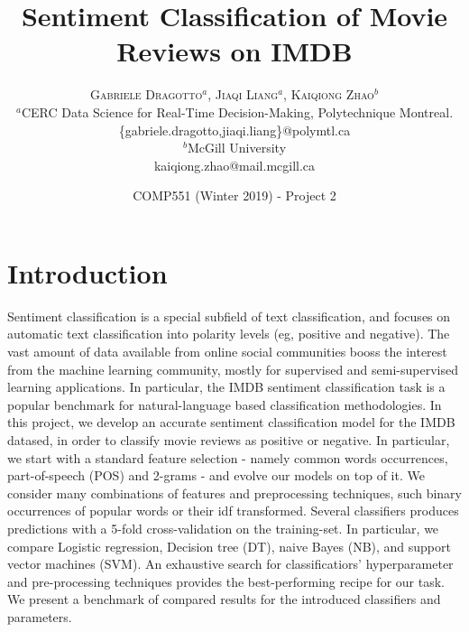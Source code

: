 \documentclass[twoside,twocolumn]{article}
\title{\myfont Sentiment Classification of Movie Reviews on IMDB} %
\author{
\textsc{Gabriele Dragotto$^a$, Jiaqi Liang$^a$, Kaiqiong Zhao$^b$}\\[1ex]
\normalsize $^a$CERC Data Science for Real-Time Decision-Making, Polytechnique Montreal.\\ 
\normalsize \{gabriele.dragotto,jiaqi.liang\}@polymtl.ca\\ 
\normalsize $^b$McGill University \\ 
\normalsize kaiqiong.zhao@mail.mcgill.ca
}
\date{COMP551 (Winter 2019) - Project 2}
\begin{document}
\maketitle


\section{Introduction}
Sentiment classification is a special subfield of text classification, and focuses on automatic text classification into polarity levels (eg, positive and negative). The vast amount of data available from online social communities booss the interest from the machine learning community, mostly for supervised and semi-supervised learning applications.
In particular, the IMDB sentiment classification task is a popular benchmark \citep{maas2011learning} for natural-language based classification methodologies. In this project, we develop an accurate sentiment classification model for the IMDB datased, in order to classify movie reviews as positive or negative. 
In particular, we start with a standard feature selection - namely common words occurrences, part-of-speech (POS) and 2-grams - and evolve our models on top of it. We consider many combinations of features and preprocessing techniques, such binary occurrences of popular words or their idf transformed. Several classifiers produces predictions with a 5-fold cross-validation on the training-set. In particular, we compare Logistic regression, Decision tree (DT), naive Bayes (NB), and support vector machines (SVM). An exhaustive search for classificatiors' hyperparameter and pre-processing techniques provides the best-performing recipe for our task. We present a benchmark of compared results for the introduced classifiers and parameters.
\end{document}
